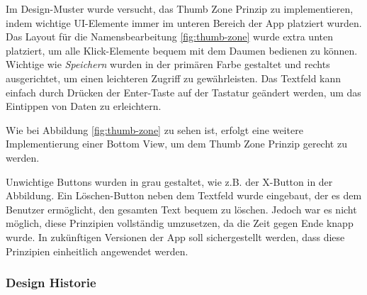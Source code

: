 Im Design-Muster wurde versucht, das Thumb Zone Prinzip zu
implementieren, indem wichtige UI-Elemente immer im unteren
Bereich der App platziert wurden. Das Layout für die
Namensbearbeitung \ref{fig:thumb-zone} wurde extra
unten platziert, um alle Klick-Elemente bequem mit dem
Daumen bedienen zu können. Wichtige
wie \textit{Speichern}
wurden in der primären Farbe gestaltet und rechts
ausgerichtet, um einen leichteren Zugriff zu gewährleisten.
Das Textfeld kann einfach durch Drücken der Enter-Taste auf
der Tastatur geändert werden, um das Eintippen von Daten zu
erleichtern.

Wie bei Abbildung \ref{fig:thumb-zone} zu sehen ist, erfolgt eine weitere Implementierung einer Bottom View, um dem Thumb Zone Prinzip gerecht zu werden.

Unwichtige Buttons wurden in grau gestaltet, wie z.B. der X-Button in der Abbildung. Ein Löschen-Button neben dem Textfeld wurde eingebaut, der es dem Benutzer ermöglicht, den gesamten Text bequem zu löschen. Jedoch war es nicht möglich, diese Prinzipien vollständig umzusetzen, da die Zeit gegen Ende knapp wurde. In zukünftigen Versionen der App soll sichergestellt werden, dass diese Prinzipien einheitlich angewendet werden.
\subsubsection{Design Historie}

